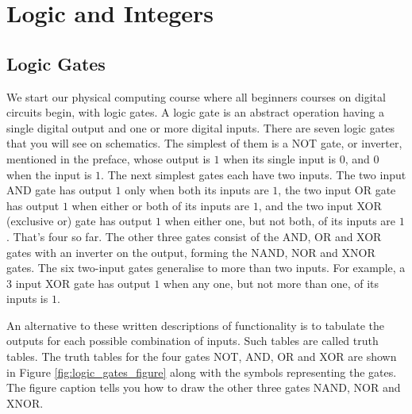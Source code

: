 \documentclass[../physical_computing.tex]{subfiles}
\begin{document}
\chapter{Logic and Integers}
\label{sec:chapter1_logic_integers}

\section{Logic Gates}
\label{sec:logicgates}

We start our physical computing course where all beginners courses on digital circuits begin, with logic gates.
A logic gate is an abstract operation having a single digital output and one or more digital inputs. There are seven
logic gates that you will see on schematics. The simplest of them is a NOT gate, or inverter, mentioned in the preface,
whose output is $1$ when its single input is $0$, and $0$ when the input is $1$. The next simplest gates each have two inputs. The two input AND gate has output $1$ only when both its inputs are $1$, the two input OR gate has output $1$ when either or both of its inputs are $1$, and the two input XOR (exclusive or) gate has output $1$ when either one, but not both, of its inputs are $1$. That's four so far. The other three gates consist of the AND, OR and XOR gates with an inverter on the output, forming the NAND, NOR and XNOR gates. The six two-input gates generalise to more than two inputs. For example, a 3 input XOR gate has output $1$ when any one, but not more than one, of its inputs is $1$.

An alternative to these written descriptions of functionality is to tabulate the outputs for each possible combination of inputs. Such tables are called truth tables. The truth tables for the four gates NOT, AND, OR and XOR are shown in Figure \ref{fig:logic_gates_figure}
along with the symbols representing the gates. The figure caption tells you how to draw the other three gates NAND, NOR and XNOR. 
\end{document}

